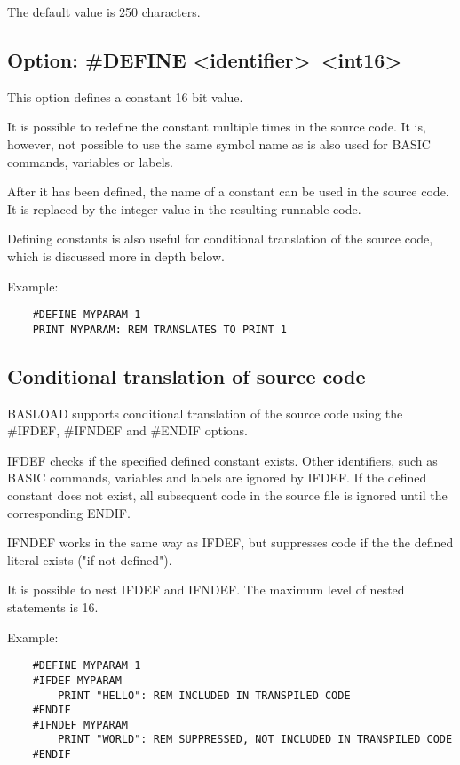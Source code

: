 \documentclass{article}
\begin{document}
        The default value is 250 characters.

    \subsection{Option: \#DEFINE \textless identifier\textgreater \  \textless int16\textgreater }
    
        This option defines a constant 16 bit value. 
        
        It is possible to redefine the constant multiple times in the source code.
        It is, however, not possible to use the same symbol name as is also
        used for BASIC commands, variables or labels.

        After it has been defined, the name of a constant can be used in
        the source code. It is replaced by the integer value in the resulting
        runnable code.

        Defining constants is also useful for conditional translation of the
        source code, which is discussed more in depth below.

        Example:

        \begin{verbatim}
    #DEFINE MYPARAM 1
    PRINT MYPARAM: REM TRANSLATES TO PRINT 1
        \end{verbatim}
    
    \subsection{Conditional translation of source code}
        
        BASLOAD supports conditional translation of the source code using
        the \#IFDEF, \#IFNDEF and \#ENDIF options.

        IFDEF checks if the specified defined constant exists. Other identifiers,
        such as BASIC commands, variables and labels are ignored by IFDEF.
        If the defined constant does not exist, all subsequent code in the source
        file is ignored until the corresponding ENDIF.

        IFNDEF works in the same way as IFDEF, but suppresses code if the
        the defined literal exists ("if not defined").

        It is possible to nest IFDEF and IFNDEF. The maximum level of nested
        statements is 16.

        Example:

        \begin{verbatim}
    #DEFINE MYPARAM 1
    #IFDEF MYPARAM
        PRINT "HELLO": REM INCLUDED IN TRANSPILED CODE
    #ENDIF
    #IFNDEF MYPARAM
        PRINT "WORLD": REM SUPPRESSED, NOT INCLUDED IN TRANSPILED CODE
    #ENDIF
        \end{verbatim}
    
\end{document}
